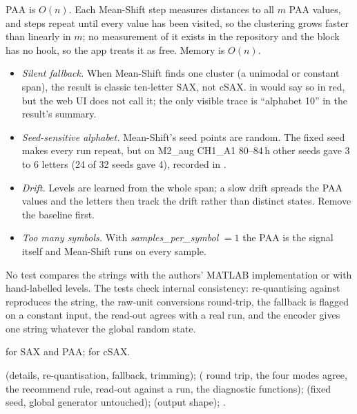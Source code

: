 PAA is $O(n)$. Each Mean-Shift step measures distances to all $m$ PAA values, and steps
repeat until every value has been visited, so the clustering grows faster than linearly in
$m$; no measurement of it exists in the repository and the block has no 
hook, so the app treats it as free. Memory is $O(n)$.

\begin{itemize}
\item \emph{Silent fallback.} When Mean-Shift finds one cluster (a unimodal or constant
  span), the result is classic ten-letter SAX, not cSAX.  in
   would say so in red, but the web UI does not call it; the
  only visible trace is ``alphabet 10'' in the result's summary.
\item \emph{Seed-sensitive alphabet.} Mean-Shift's seed points are random. The fixed seed
  makes every run repeat, but on M2\_aug CH1\_A1 80--84\,h other seeds gave 3 to 6 letters
  (24 of 32 seeds gave 4), recorded in .
\item \emph{Drift.} Levels are learned from the whole span; a slow drift spreads the PAA
  values and the letters then track the drift rather than distinct states. Remove the
  baseline first.
\item \emph{Too many symbols.} With \emph{samples\_per\_symbol} $=1$ the PAA is the signal
  itself and Mean-Shift runs on every sample.
\end{itemize}

No test compares the strings with the authors' MATLAB implementation or with hand-labelled
levels. The tests check internal consistency: re-quantising  against
 reproduces the string, the raw-unit conversions round-trip, the
fallback is flagged on a constant input, the read-out agrees with a real run, and the
encoder gives one string whatever the global random state.

\citet{lin2003symbolic} for SAX and PAA; \citet{bountrogiannis2022distribution} for cSAX.

 (details, re-quantisation, fallback, trimming);
 ( round trip, the four modes agree, the
recommend rule, read-out against a run, the diagnostic functions);
 (fixed seed, global generator untouched);
 (output shape); .
